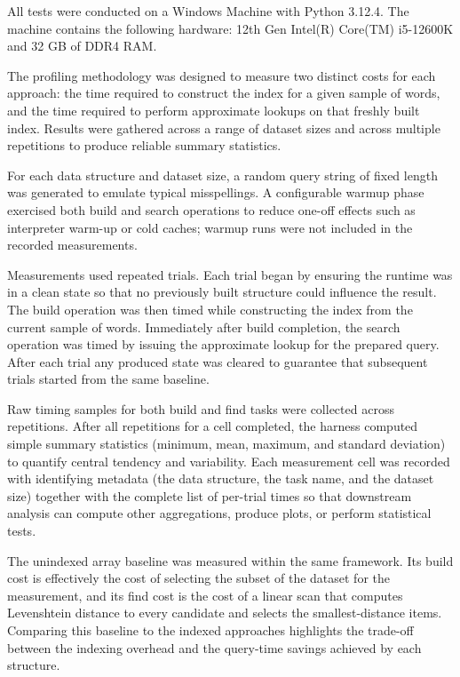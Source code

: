 \documentclass[acmsmall,screen, nonacm]{acmart}
\begin{document}
All tests were conducted on a Windows Machine with Python 3.12.4.
The machine contains the following hardware: 12th Gen Intel(R) Core(TM) i5-12600K and 32 GB of DDR4 RAM.

The profiling methodology was designed to measure two distinct costs for each approach: the time required to construct the index for a given sample of words, and the time required to perform approximate lookups on that freshly built index. Results were gathered across a range of dataset sizes and across multiple repetitions to produce reliable summary statistics.

For each data structure and dataset size, a random query string of fixed length was generated to emulate typical misspellings. A configurable warmup phase exercised both build and search operations to reduce one-off effects such as interpreter warm-up or cold caches; warmup runs were not included in the recorded measurements.

Measurements used repeated trials. Each trial began by ensuring the runtime was in a clean state so that no previously built structure could influence the result. The build operation was then timed while constructing the index from the current sample of words. Immediately after build completion, the search operation was timed by issuing the approximate lookup for the prepared query. After each trial any produced state was cleared to guarantee that subsequent trials started from the same baseline.

Raw timing samples for both build and find tasks were collected across repetitions. After all repetitions for a cell completed, the harness computed simple summary statistics (minimum, mean, maximum, and standard deviation) to quantify central tendency and variability. Each measurement cell was recorded with identifying metadata (the data structure, the task name, and the dataset size) together with the complete list of per-trial times so that downstream analysis can compute other aggregations, produce plots, or perform statistical tests.

The unindexed array baseline was measured within the same framework. Its build cost is effectively the cost of selecting the subset of the dataset for the measurement, and its find cost is the cost of a linear scan that computes Levenshtein distance to every candidate and selects the smallest-distance items. Comparing this baseline to the indexed approaches highlights the trade-off between the indexing overhead and the query-time savings achieved by each structure.
\end{document}
